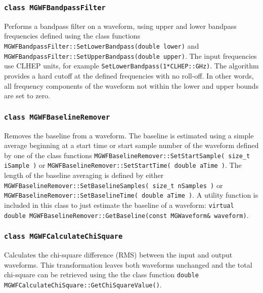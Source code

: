 			\subsubsection{\lstinline!class MGWFBandpassFilter!}
Performs a bandpass filter on a waveform, using upper and lower bandpass frequencies defined using the class functions \lstinline!MGWFBandpassFilter::SetLowerBandpass(double lower)! and \lstinline!MGWFBandpassFilter::SetUpperBandpass(double upper)!.  The input frequencies use CLHEP units, for example \lstinline!SetLowerBandpass(1*CLHEP::GHz)!.  The algorithm provides a hard cutoff at the defined frequencies with no roll-off.  In other words, all frequency components of the waveform not within the lower and upper bounds are set to zero.
			
			\subsubsection{\lstinline!class MGWFBaselineRemover!}
Removes the baseline from a waveform.  The baseline is estimated using a simple average beginning at a start time or start sample number of the waveform defined by one of the class functions \lstinline!MGWFBaselineRemover::SetStartSample( size_t iSample )! or \lstinline!MGWFBaselineRemover::SetStartTime( double aTime )!.  The length of the baseline averaging is defined by either \lstinline!MGWFBaselineRemover::SetBaselineSamples( size_t nSamples )! or \lstinline!MGWFBaselineRemover::SetBaselineTime( double aTime )!.  A utility function is included in this class to just estimate the baseline of a waveform: \lstinline!virtual double MGWFBaselineRemover::GetBaseline(const MGWaveform& waveform)!.

			\subsubsection{\lstinline!class MGWFCalculateChiSquare!}
Calculates the chi-square difference (RMS) between the input and output waveforms.  This transformation leaves both waveforms unchanged and the total chi-square can be retrieved using the the class function \lstinline!double MGWFCalculateChiSquare::GetChiSquareValue()!.

